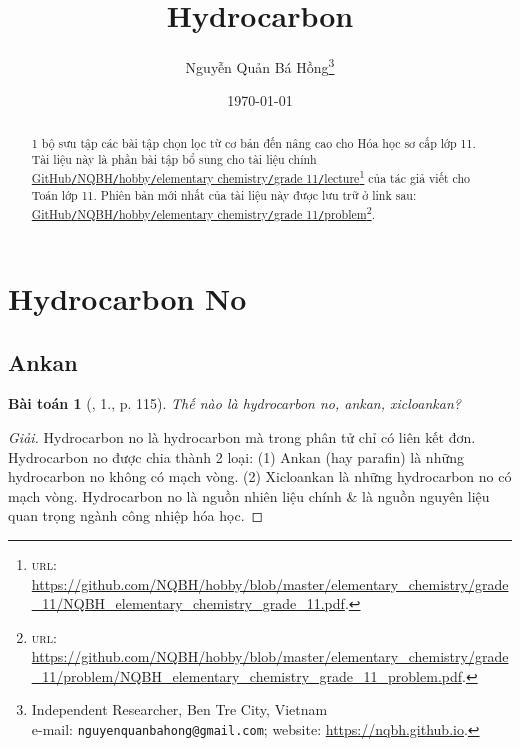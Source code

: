 \documentclass{article}
\title{Hydrocarbon}
\author{Nguyễn Quản Bá Hồng\footnote{Independent Researcher, Ben Tre City, Vietnam\\e-mail: \texttt{nguyenquanbahong@gmail.com}; website: \url{https://nqbh.github.io}.}}
\date{\today}
\newtheorem{baitoan}{Bài toán}
\begin{document}
\maketitle
\begin{abstract}
	1 bộ sưu tập các bài tập chọn lọc từ cơ bản đến nâng cao cho Hóa học sơ cấp lớp 11. Tài liệu này là phần bài tập bổ sung cho tài liệu chính \href{https://github.com/NQBH/hobby/blob/master/elementary_chemistry/grade_11/NQBH_elementary_chemistry_grade_11.pdf}{GitHub\texttt{/}NQBH\texttt{/}hobby\texttt{/}elementary chemistry\texttt{/}grade 11\texttt{/}lecture}\footnote{\textsc{url}: \url{https://github.com/NQBH/hobby/blob/master/elementary_chemistry/grade_11/NQBH_elementary_chemistry_grade_11.pdf}.} của tác giả viết cho Toán lớp 11. Phiên bản mới nhất của tài liệu này được lưu trữ ở link sau: \href{https://github.com/NQBH/hobby/blob/master/elementary_chemistry/grade_11/problem/NQBH_elementary_chemistry_grade_11_problem.pdf}{GitHub\texttt{/}NQBH\texttt{/}hobby\texttt{/}elementary chemistry\texttt{/}grade 11\texttt{/}problem}\footnote{\textsc{url}: \url{https://github.com/NQBH/hobby/blob/master/elementary_chemistry/grade_11/problem/NQBH_elementary_chemistry_grade_11_problem.pdf}.}.
\end{abstract}
\tableofcontents
\newpage


\section{Hydrocarbon No}

\subsection{Ankan}

\begin{baitoan}[\cite{SGK_Hoa_Hoc_11_co_ban}, 1., p. 115]
	Thế nào là hydrocarbon no, ankan, xicloankan?
\end{baitoan}

\begin{proof}[Giải]
	Hydrocarbon no là hydrocarbon mà trong phân tử chỉ có liên kết đơn. Hydrocarbon no được chia thành 2 loại: (1) Ankan (hay parafin) là những hydrocarbon no không có mạch vòng. (2) Xicloankan là những hydrocarbon no có mạch vòng. Hydrocarbon no là nguồn nhiên liệu chính \& là nguồn nguyên liệu quan trọng ngành công nhiệp hóa học.
\end{proof}
\end{document}

